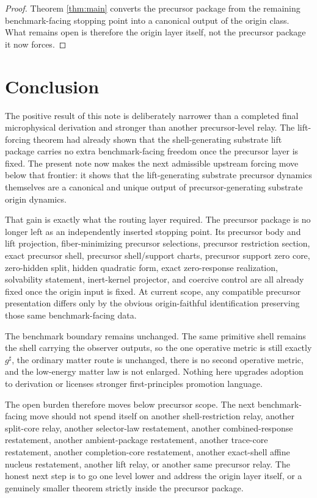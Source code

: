 \documentclass[11pt]{article}
\newcommand{\CompletedMetric}{g^{\sharp}}
\begin{document}
\begin{proof}
Theorem \ref{thm:main} converts the precursor package from the remaining benchmark-facing stopping point into a canonical output of the origin class. What remains open is therefore the origin layer itself, not the precursor package it now forces.
\end{proof}

\section{Conclusion}

The positive result of this note is deliberately narrower than a completed final microphysical derivation and stronger than another precursor-level relay. The lift-forcing theorem had already shown that the shell-generating substrate lift package carries no extra benchmark-facing freedom once the precursor layer is fixed. The present note now makes the next admissible upstream forcing move below that frontier: it shows that the lift-generating substrate precursor dynamics themselves are a canonical and unique output of precursor-generating substrate origin dynamics.

That gain is exactly what the routing layer required. The precursor package is no longer left as an independently inserted stopping point. Its precursor body and lift projection, fiber-minimizing precursor selections, precursor restriction section, exact precursor shell, precursor shell/support charts, precursor support zero core, zero-hidden split, hidden quadratic form, exact zero-response realization, solvability statement, inert-kernel projector, and coercive control are all already fixed once the origin input is fixed. At current scope, any compatible precursor presentation differs only by the obvious origin-faithful identification preserving those same benchmark-facing data.

The benchmark boundary remains unchanged. The same primitive shell remains the shell carrying the observer outputs, so the one operative metric is still exactly \(\CompletedMetric\), the ordinary matter route is unchanged, there is no second operative metric, and the low-energy matter law is not enlarged. Nothing here upgrades adoption to derivation or licenses stronger first-principles promotion language.

The open burden therefore moves below precursor scope. The next benchmark-facing move should not spend itself on another shell-restriction relay, another split-core relay, another selector-law restatement, another combined-response restatement, another ambient-package restatement, another trace-core restatement, another completion-core restatement, another exact-shell affine nucleus restatement, another lift relay, or another same precursor relay. The honest next step is to go one level lower and address the origin layer itself, or a genuinely smaller theorem strictly inside the precursor package.
\end{document}

